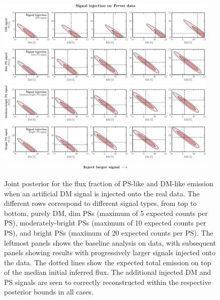 \documentclass[prd,aps,10pt,nofootinbib,twocolumn,superscriptaddress,preprintnumbers,balancelastpage,longbibliography]{revtex4-1}
\begin{document}
%
\begin{figure}
\centering
\includegraphics[width=0.95\textwidth]{plots/sig_inj_title.pdf}
\includegraphics[width=0.95\textwidth]{plots/data_sig_inj_dm.pdf}
\includegraphics[width=0.95\textwidth]{plots/data_sig_inj_dim_ps.pdf}
\includegraphics[width=0.95\textwidth]{plots/data_sig_inj_med_ps.pdf}
\includegraphics[width=0.95\textwidth]{plots/data_sig_inj_ps.pdf}
\includegraphics[width=0.95\textwidth]{plots/sig_inj_chyron.pdf}
\caption{Joint posterior for the flux fraction of PS-like and DM-like emission when an artificial DM signal is injected onto the real \Fermi data. The different rows correspond to different signal types, from top to bottom, purely DM, dim PSs (maximum of 5 expected counts per PS), moderately-bright PSs (maximum of 10 expected counts per PS), and bright PSs (maximum of 20 expected counts per PS). The leftmost panels shows the baseline analysis on \Fermi data, with subsequent panels showing results with progressively larger signals injected onto the data. The dotted lines show the expected total emission on top of the median initial inferred flux. The additional injected DM and PS signals are seen to correctly reconstructed within the respective posterior bounds in all cases.}
\label{fig:sig_inj_data}
\end{figure}
%
\end{document}
